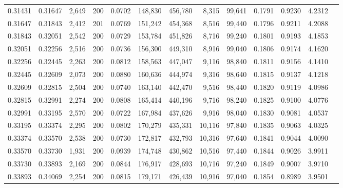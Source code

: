 \begin{tabular}{rrrrrrrrrrrrr}
0.31431 & 0.31647 & 2,649 & 200 &                                     0.0702 & 148,830 & 456,780 &   8,315 &  99,641 & 0.1791 & 0.9230 & 4.2312 \\
0.31647 & 0.31843 & 2,412 & 201 &                                     0.0769 & 151,242 & 454,368 &   8,516 &  99,440 & 0.1796 & 0.9211 & 4.2088 \\
0.31843 & 0.32051 & 2,542 & 200 &                                     0.0729 & 153,784 & 451,826 &   8,716 &  99,240 & 0.1801 & 0.9193 & 4.1853 \\
0.32051 & 0.32256 & 2,516 & 200 &                                     0.0736 & 156,300 & 449,310 &   8,916 &  99,040 & 0.1806 & 0.9174 & 4.1620 \\
0.32256 & 0.32445 & 2,263 & 200 &                                     0.0812 & 158,563 & 447,047 &   9,116 &  98,840 & 0.1811 & 0.9156 & 4.1410 \\
0.32445 & 0.32609 & 2,073 & 200 &                                     0.0880 & 160,636 & 444,974 &   9,316 &  98,640 & 0.1815 & 0.9137 & 4.1218 \\
0.32609 & 0.32815 & 2,504 & 200 &                                     0.0740 & 163,140 & 442,470 &   9,516 &  98,440 & 0.1820 & 0.9119 & 4.0986 \\
0.32815 & 0.32991 & 2,274 & 200 &                                     0.0808 & 165,414 & 440,196 &   9,716 &  98,240 & 0.1825 & 0.9100 & 4.0776 \\
0.32991 & 0.33195 & 2,570 & 200 &                                     0.0722 & 167,984 & 437,626 &   9,916 &  98,040 & 0.1830 & 0.9081 & 4.0537 \\
0.33195 & 0.33374 & 2,295 & 200 &                                     0.0802 & 170,279 & 435,331 &  10,116 &  97,840 & 0.1835 & 0.9063 & 4.0325 \\
0.33374 & 0.33570 & 2,538 & 200 &                                     0.0730 & 172,817 & 432,793 &  10,316 &  97,640 & 0.1841 & 0.9044 & 4.0090 \\
0.33570 & 0.33730 & 1,931 & 200 &                                     0.0939 & 174,748 & 430,862 &  10,516 &  97,440 & 0.1844 & 0.9026 & 3.9911 \\
0.33730 & 0.33893 & 2,169 & 200 &                                     0.0844 & 176,917 & 428,693 &  10,716 &  97,240 & 0.1849 & 0.9007 & 3.9710 \\
0.33893 & 0.34069 & 2,254 & 200 &                                     0.0815 & 179,171 & 426,439 &  10,916 &  97,040 & 0.1854 & 0.8989 & 3.9501 \\

\end{tabular}
